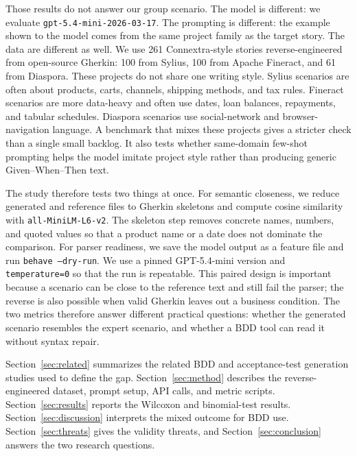 Those results do not answer our group scenario. The model is different: we evaluate \texttt{gpt-5.4-mini-2026-03-17}. The prompting is different: the example shown to the model comes from the same project family as the target story. The data are different as well. We use 261 Connextra-style stories reverse-engineered from open-source Gherkin: 100 from Sylius, 100 from Apache Fineract, and 61 from Diaspora. These projects do not share one writing style. Sylius scenarios are often about products, carts, channels, shipping methods, and tax rules. Fineract scenarios are more data-heavy and often use dates, loan balances, repayments, and tabular schedules. Diaspora scenarios use social-network and browser-navigation language. A benchmark that mixes these projects gives a stricter check than a single small backlog. It also tests whether same-domain few-shot prompting helps the model imitate project style rather than producing generic Given--When--Then text.

The study therefore tests two things at once. For semantic closeness, we reduce generated and reference files to Gherkin skeletons and compute cosine similarity with \texttt{all-MiniLM-L6-v2}. The skeleton step removes concrete names, numbers, and quoted values so that a product name or a date does not dominate the comparison. For parser readiness, we save the model output as a feature file and run \texttt{behave --dry-run}. We use a pinned GPT-5.4-mini version and \texttt{temperature=0} so that the run is repeatable. This paired design is important because a scenario can be close to the reference text and still fail the parser; the reverse is also possible when valid Gherkin leaves out a business condition. The two metrics therefore answer different practical questions: whether the generated scenario resembles the expert scenario, and whether a BDD tool can read it without syntax repair.

Section~\ref{sec:related} summarizes the related BDD and acceptance-test generation studies used to define the gap. Section~\ref{sec:method} describes the reverse-engineered dataset, prompt setup, API calls, and metric scripts. Section~\ref{sec:results} reports the Wilcoxon and binomial-test results. Section~\ref{sec:discussion} interprets the mixed outcome for BDD use. Section~\ref{sec:threats} gives the validity threats, and Section~\ref{sec:conclusion} answers the two research questions.

